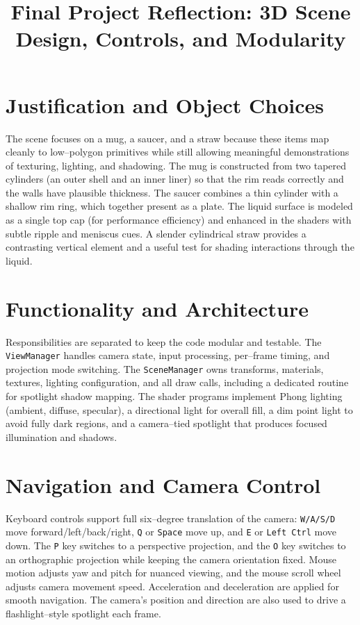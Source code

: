\documentclass[stu,12pt]{apa7}
\title{Final Project Reflection: 3D Scene Design, Controls, and Modularity}
\begin{document}
\maketitle

\section{Justification and Object Choices}
The scene focuses on a mug, a saucer, and a straw because these items map cleanly to low--polygon primitives while still allowing meaningful demonstrations of texturing, lighting, and shadowing. The mug is constructed from two tapered cylinders (an outer shell and an inner liner) so that the rim reads correctly and the walls have plausible thickness. The saucer combines a thin cylinder with a shallow rim ring, which together present as a plate. The liquid surface is modeled as a single top cap (for performance efficiency) and enhanced in the shaders with subtle ripple and meniscus cues. A slender cylindrical straw provides a contrasting vertical element and a useful test for shading interactions through the liquid.

\section{Functionality and Architecture}
Responsibilities are separated to keep the code modular and testable. The \texttt{ViewManager} handles camera state, input processing, per--frame timing, and projection mode switching. The \texttt{SceneManager} owns transforms, materials, textures, lighting configuration, and all draw calls, including a dedicated routine for spotlight shadow mapping. The shader programs implement Phong lighting (ambient, diffuse, specular), a directional light for overall fill, a dim point light to avoid fully dark regions, and a camera--tied spotlight that produces focused illumination and shadows.

\section{Navigation and Camera Control}
Keyboard controls support full six--degree translation of the camera: \texttt{W/A/S/D} move forward/left/back/right, \texttt{Q} or \texttt{Space} move up, and \texttt{E} or \texttt{Left Ctrl} move down. The \texttt{P} key switches to a perspective projection, and the \texttt{O} key switches to an orthographic projection while keeping the camera orientation fixed. Mouse motion adjusts yaw and pitch for nuanced viewing, and the mouse scroll wheel adjusts camera movement speed. Acceleration and deceleration are applied for smooth navigation. The camera’s position and direction are also used to drive a flashlight--style spotlight each frame.
\end{document}
